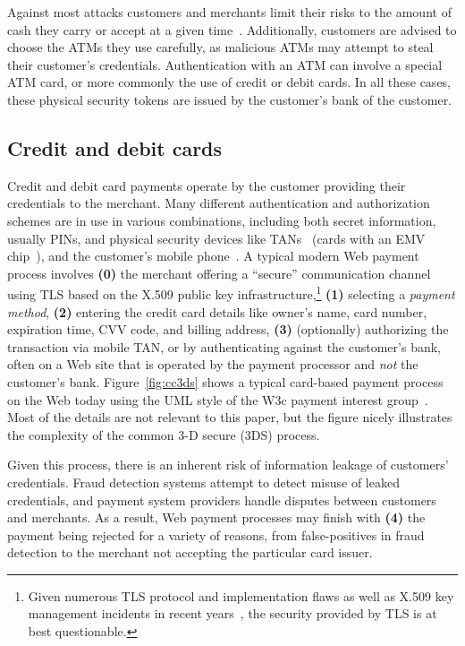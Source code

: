 \documentclass{IEEEtran}
\begin{document}
Against most attacks customers and merchants limit their risks to the
amount of cash they carry or accept at a given time~\cite{Bankrate}.
Additionally, customers are advised to choose the ATMs they use
carefully, as malicious ATMs may attempt to steal their customer's
credentials.  Authentication with an ATM can involve a special ATM
card, or more commonly the use of credit or debit cards.  In all these
cases, these physical security tokens are issued by the customer's
bank of the customer.


\subsection{Credit and debit cards}

Credit and debit card payments operate by the customer providing their
credentials to the merchant.  Many different
authentication and authorization schemes are in use in various
combinations, including both secret information, usually PINs, and
physical security devices like TANs~\cite{kobil2016tan}
(cards with an EMV chip~\cite{emv}), and
 the customer's mobile phone~\cite{mtan}.
A typical modern Web payment process involves
{\bf (0)} the merchant offering a ``secure'' communication channel
using TLS based on the X.509 public key infrastructure,\footnote{Given
numerous TLS protocol and implementation flaws as well as X.509 key
management incidents in recent years~\cite{holz2014}, the security
provided by TLS is at best questionable.}
{\bf (1)} selecting a {\em payment method},
{\bf (2)} entering the credit card details like owner's name,
 card number, expiration time, CVV code, and billing address,
{\bf (3)} (optionally) authorizing the transaction via mobile TAN, or
 by authenticating against the customer's bank,
often on a Web site that is operated by the payment
processor and {\em not} the customer's bank.  Figure~\ref{fig:cc3ds}
shows a typical card-based payment process on the Web today using the
UML style of the W3c payment interest group~\cite{pigs}.  Most of the
details are not relevant to this paper, but the figure nicely
illustrates the complexity of the common 3-D secure (3DS) process.

Given this process, there is an inherent risk of information leakage
of customers' credentials.  Fraud detection systems attempt to detect
misuse of leaked credentials, and payment system providers handle
disputes between customers and merchants.  As a result, Web payment
processes may finish with {\bf (4)} the payment being rejected for a
variety of reasons, from false-positives in fraud detection to the
merchant not accepting the particular card issuer.
\end{document}

